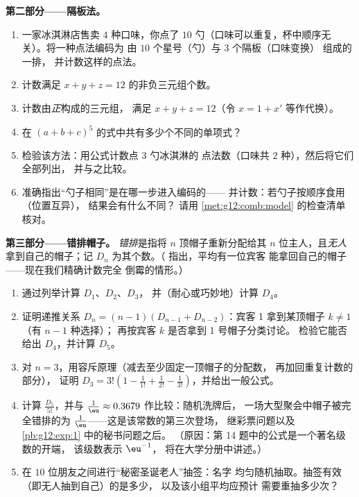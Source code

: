 \begin{problem}
\medskip
\noindent\textbf{第二部分——隔板法。}
\begin{enumerate}[resume]
  \item 一家冰淇淋店售卖 $4$ 种口味，你点了 $10$
        勺（口味可以重复，杯中顺序无关）。将一种点法编码为
        由 $10$ 个星号（勺）与 $3$ 个隔板（口味变换）
        组成的一排，
        并计数这样的点法。
  \item 计数满足
        $x + y + z = 12$ 的非负三元组个数。
  \item 计数由\emph{正}构成的三元组，
        满足 $x + y + z = 12$（令 $x = 1 + x'$ 等作代换）。
  \item 在
        $(a + b + c)^5$ 的式中共有多少个不同的单项式？
  \item 检验该方法：用公式计数点 $3$ 勺冰淇淋的
        点法数（口味共 $2$ 种），然后将它们全部列出，
        并与之比较。
  \item 准确指出“勺子相同”是在哪一步进入编码的——
        并计数：若勺子按顺序食用（位置互异），
        结果会有什么不同？
        请用 \cref{met:g12:comb:model} 的检查清单核对。
\end{enumerate}

\medskip
\noindent\textbf{第三部分——错排帽子。}
\emph{错排}是指将 $n$ 顶帽子重新分配给其
$n$ 位主人，且\emph{无人}拿到自己的帽子；记
$D_n$ 为其个数。（ 指出，平均有一位宾客
能拿回自己的帽子——现在我们精确计数完全
倒霉的情形。）
\begin{enumerate}[resume]
  \item 通过列举计算 $D_1$、$D_2$、$D_3$，
        并（耐心或巧妙地）计算 $D_4$。
  \item 证明递推关系
        $D_n = (n - 1)\left(D_{n-1} + D_{n-2}\right)$：宾客 1
        拿到某顶帽子 $k \neq 1$（有 $n - 1$ 种选择）；
        再按宾客 $k$ 是否拿到 1 号帽子分类讨论。
        检验它能否给出 $D_4$，并计算 $D_5$。
  \item 对 $n = 3$，用容斥原理（减去至少固定一顶帽子的分配数，
        再加回重复计数的部分），
        证明
        $D_3 = 3!\left(1 - \frac{1}{1!} + \frac{1}{2!} -
        \frac{1}{3!}\right)$，并给出一般公式。
  \item 计算 $\frac{D_5}{5!}$，并与
        $\frac1\eu \approx 0.3679$ 作比较：随机洗牌后，
        一场大型聚会中帽子被完全错排的为
        $\frac1\eu$——这是该常数的第三次登场，
        继彩票问题以及 \cref{pb:g12:exp:1} 中的秘书问题之后。
        （原因：第 14 题中的公式是一个著名级数的开端，
        该级数表示 $\eu^{-1}$，
        将在大学分册中讲述。）
  \item 在 $10$ 位朋友之间进行“秘密圣诞老人”抽签：名字
        均匀随机抽取。抽签有效（即无人抽到自己）的是多少，
        以及该小组平均应预计
        需要重抽多少次？
\end{enumerate}


\end{problem}
